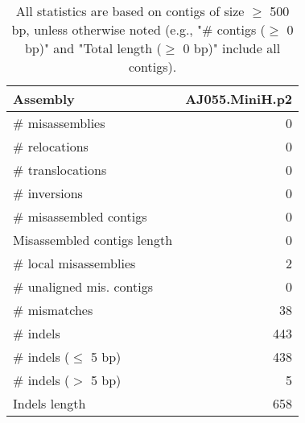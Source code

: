 \documentclass[12pt,a4paper]{article}
\begin{document}
\begin{table}[ht]
\begin{center}
\caption{All statistics are based on contigs of size $\geq$ 500 bp, unless otherwise noted (e.g., "\# contigs ($\geq$ 0 bp)" and "Total length ($\geq$ 0 bp)" include all contigs).}
\begin{tabular}{|l*{1}{|r}|}
\hline
Assembly & AJ055.MiniH.p2 \\ \hline
\# misassemblies & 0 \\ \hline
\hspace{5mm}\# relocations & 0 \\ \hline
\hspace{5mm}\# translocations & 0 \\ \hline
\hspace{5mm}\# inversions & 0 \\ \hline
\# misassembled contigs & 0 \\ \hline
Misassembled contigs length & 0 \\ \hline
\# local misassemblies & 2 \\ \hline
\# unaligned mis. contigs & 0 \\ \hline
\# mismatches & 38 \\ \hline
\# indels & 443 \\ \hline
\hspace{5mm}\# indels ($\leq$ 5 bp) & 438 \\ \hline
\hspace{5mm}\# indels ($>$ 5 bp) & 5 \\ \hline
Indels length & 658 \\ \hline
\end{tabular}
\end{center}
\end{table}
\end{document}
